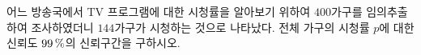 어느 방송국에서 TV 프로그램에 대한 시청률을 알아보기 위하여 $400$가구를 임의추출하여 조사하였더니 $144$가구가 시청하는 것으로 나타났다. 전체 가구의 시청률 $p$에 대한 신뢰도 $99\mkern3mu \%$의 신뢰구간을 구하시오. 
